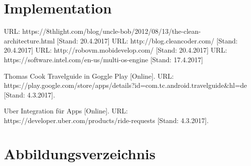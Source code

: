 \documentclass[a4paper,10pt,xetex]{article}
\begin{document}
\section{Implementation}





\begin{thebibliography}{9}
   URL: https://8thlight.com/blog/uncle-bob/2012/08/13/the-clean-architecture.html [Stand: 20.4.2017]
   URL: http://blog.cleancoder.com/ [Stand: 20.4.2017]
   URL: http://robovm.mobidevelop.com/ [Stand: 20.4.2017]
   URL: https://software.intel.com/en-us/multi-os-engine [Stand: 17.4.2017]

    Thomas Cook Travelguide in Goggle Play [Online].
    URL: https://play.google.com/store/apps/details?id=com.tc.android.travelguide\&hl=de [Stand: 4.3.2017].

    Uber Integration für Apps [Online].
    URL: https://developer.uber.com/products/ride-requests [Stand: 4.3.2017].
\end{thebibliography}

\section*{Abbildungsverzeichnis}\label{abbildungsverzeichnis}
\begingroup
\renewcommand{\section}[2]{}%
\hypersetup{linkcolor=black}
\listoffigures
\endgroup
\end{document}
